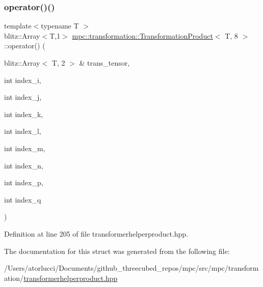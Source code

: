 \subsubsection{\texorpdfstring{operator()()}{operator()()}}
{\footnotesize\ttfamily template$<$typename T $>$ \\
blitz\+::\+Array$<$T,1$>$ \mbox{\hyperlink{structmpc_1_1transformation_1_1_transformation_product}{mpc\+::transformation\+::\+Transformation\+Product}}$<$ T, 8 $>$\+::operator() (\begin{DoxyParamCaption}\item[{blitz\+::\+Array$<$ T, 2 $>$ \&}]{trans\+\_\+tensor,  }\item[{int}]{index\+\_\+i,  }\item[{int}]{index\+\_\+j,  }\item[{int}]{index\+\_\+k,  }\item[{int}]{index\+\_\+l,  }\item[{int}]{index\+\_\+m,  }\item[{int}]{index\+\_\+n,  }\item[{int}]{index\+\_\+p,  }\item[{int}]{index\+\_\+q }\end{DoxyParamCaption})\hspace{0.3cm}{\ttfamily [inline]}}



Definition at line 205 of file transformerhelperproduct.\+hpp.



The documentation for this struct was generated from the following file\+:\begin{DoxyCompactItemize}
\item 
/\+Users/atorlucci/\+Documents/github\+\_\+threecubed\+\_\+repos/mpc/src/mpc/transformation/\mbox{\hyperlink{transformerhelperproduct_8hpp}{transformerhelperproduct.\+hpp}}\end{DoxyCompactItemize}

